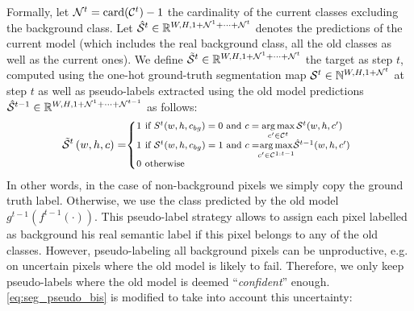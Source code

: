 Formally, let $\mathcal{N}^t=\operatorname{card}(\mathcal{C}^{t})-1$ the cardinality of the current classes
excluding the background class. Let $\hat{\mathcal{S}}^{t} \in \mathbb{R}^{W,H,1+\mathcal{N}^1 +\dots + \mathcal{N}^t}$
denotes the predictions of the current model (which includes the real background class, all the old
classes as well as the current ones). We define $\tilde{\mathcal{S}}^{t} \in \mathbb{R}^{W,H,1+\mathcal{N}^1
        +\dots + \mathcal{N}^t}$ the target as step $t$, computed using the one-hot ground-truth segmentation map
$\mathcal{S}^{t} \in \mathbb{N}^{W,H,1+\mathcal{N}^t}$ at step $t$ as well as pseudo-labels extracted using the
old model predictions $\hat{\mathcal{S}}^{t-1} \in \mathbb{R}^{W,H,1+\mathcal{N}^1 +\dots + \mathcal{N}^{t-1}}$ as
follows:
%
\begin{equation}
    \footnotesize
    \tilde \mcS^{t}\left(w,h,c\right)= \mkern-5mu \left\{\begin{array}{ll}
        \mkern-10mu 1 \mkern-27mu & \text { if } S^{t} (w,h,c_{bg})=0 \text { and } c = \argmax \limits_{c' \in \mcC^{t}} \mcS^{t}(w,h,c')                                     \\
        \mkern-10mu 1 \mkern-27mu & \text { if } \mcS^{t}(w,h,c_{bg})=1 \text { and } c = \mkern-8mu \argmax \limits_{c' \in \mcC^{1:t-1}} \mkern-6mu \hat{\mcS}^{t-1}(w,h,c') \\
        \mkern-10mu 0 \mkern-27mu & \text { otherwise }                                                                                                                        \\
    \end{array}\right.
    \label{eq:seg_pseudo_bis}
\end{equation}
%
In other words, in the case of non-background pixels we simply copy the ground truth label.
Otherwise, we use the class predicted by the old model $g^{t-1}(f^{t-1}(\cdot))$. This pseudo-label
strategy allows to assign each pixel labelled as background his real semantic label if this pixel
belongs to any of the old classes. However, pseudo-labeling all background pixels can be
unproductive, e.g. on uncertain pixels where the old model is likely to fail. Therefore, we only keep
pseudo-labels where the old model is deemed ``\textit{confident}'' enough.
\autoref{eq:seg_pseudo_bis} is modified to take into account this uncertainty:
%

